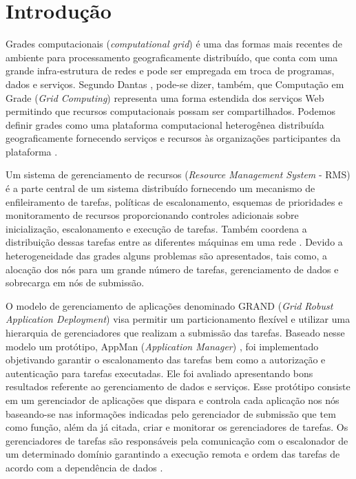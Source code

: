 \chapter{Introdução}
\label{cap:introducao}

Grades computacionais (\emph{computational grid}) é uma das formas mais recentes de ambiente para processamento geograficamente distribuído, que conta com uma grande infra-estrutura de redes e pode ser empregada em troca de programas, dados e serviços. Segundo Dantas \cite{Dantas2005}, pode-se dizer, também, que Computação em Grade (\emph{Grid Computing}) representa uma forma estendida dos serviços Web permitindo que recursos computacionais possam ser compartilhados. Podemos definir grades como uma plataforma computacional heterogênea distribuída geograficamente fornecendo serviços e recursos às organizações participantes da plataforma \cite{Dantas2005}. 
       
Um sistema de gerenciamento de recursos (\emph{Resource Management System} - RMS) é a parte central de um sistema distribuído fornecendo um mecanismo de enfileiramento de tarefas, políticas de escalonamento, esquemas de prioridades e monitoramento de recursos proporcionando controles adicionais sobre inicialização, escalonamento e execução de tarefas. Também coordena a distribuição dessas tarefas entre as diferentes máquinas em uma rede \cite{condor2007, Bayucan2007, Mangan2006}. Devido a heterogeneidade das grades alguns problemas são apresentados, tais como, a alocação dos nós para um grande número de tarefas, gerenciamento de dados e sobrecarga em nós de submissão. 

O modelo de gerenciamento de aplicações denominado GRAND (\emph{Grid Robust Application Deployment}) \cite{Mangan2006} visa permitir um particionamento flexível e utilizar uma hierarquia de gerenciadores que realizam a submissão das tarefas. Baseado nesse modelo um protótipo, AppMan (\emph{Application Manager}) \cite{Vargas2003}, foi implementado objetivando garantir o escalonamento das tarefas bem como a autorização e autenticação para tarefas executadas. Ele foi avaliado apresentando bons resultados referente ao gerenciamento de dados e serviços. Esse protótipo consiste em um gerenciador de aplicações que dispara e controla cada aplicação nos nós baseando-se nas informações indicadas pelo gerenciador de submissão que tem como função, além da já citada, criar e monitorar os gerenciadores de tarefas. Os gerenciadores de tarefas são responsáveis pela comunicação com o escalonador de um determinado domínio garantindo a execução remota e ordem das tarefas de acordo com a dependência de dados \cite{Mangan2006}.


